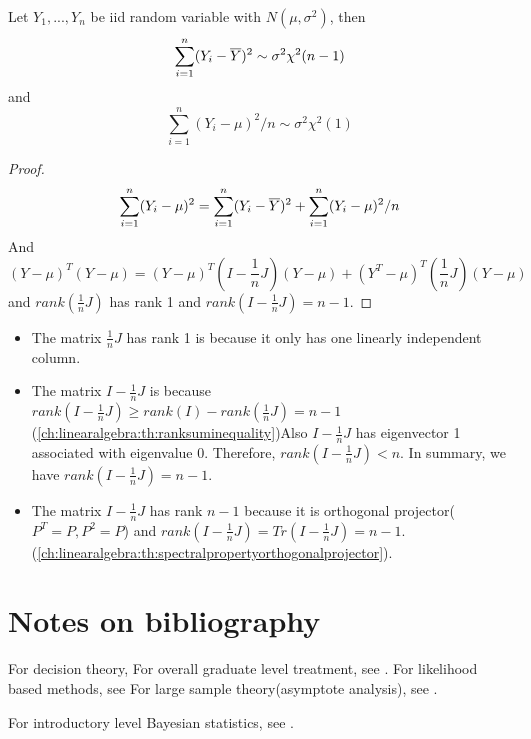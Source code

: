 \begin{refsection}
\begin{corollary}\label{ch:theory-of-statistics:th:samplevariancedistribution}
	Let $Y_1,...,Y_n$ be iid random variable with $N(\mu,\sigma^2)$, then
	$$\sum_{i=1}^n (Y_i - \overline{Y})^2 \sim \sigma^2 \chi^2(n-1)$$
	and
	$$\sum_{i=1}^n (Y_i - \mu)^2/n \sim \sigma^2 \chi^2(1)$$
\end{corollary}
\begin{proof}
	$$\sum_{i=1}^n (Y_i- \mu)^2 = \sum_{i=1}^n (Y_i - \overline{Y})^2 + \sum_{i=1}^n (Y_i - \mu)^2/n$$
	And
	$$(Y-\mu)^T(Y-\mu) = (Y-\mu)^T(I - \frac{1}{n}J)(Y-\mu) + (Y^T-\mu)^T(\frac{1}{n}J)(Y-\mu)$$
	and $rank(\frac{1}{n}J)$ has rank 1 and $rank(I - \frac{1}{n}J) = n-1$.
\end{proof}


\begin{remark}\hfill
	\begin{itemize}
		\item The matrix $\frac{1}{n}J$ has rank 1 is because it only has one linearly independent column.
		\item The matrix $I - \frac{1}{n}J$ is because
		$rank(I - \frac{1}{n}J) \geq rank(I) - rank(\frac{1}{n}J) = n-1$(\autoref{ch:linearalgebra:th:ranksuminequality})Also  $I - \frac{1}{n}J$ has eigenvector 1 associated with eigenvalue 0. Therefore, $rank(I - \frac{1}{n}J) < n$. In summary, we have $rank(I - \frac{1}{n}J)=n-1$.
		\item The matrix $I -  \frac{1}{n}J$ has rank $n-1$ because it is orthogonal projector($P^T=P,P^2=P$) and $rank(I -  \frac{1}{n}J)=Tr(I -  \frac{1}{n}J) = n-1$.(\autoref{ch:linearalgebra:th:spectralpropertyorthogonalprojector}).
	\end{itemize}
\end{remark}



\section{Notes on bibliography}
For decision theory, \cite{young2005essentials}\cite{moon2000mathematical}
For overall graduate level treatment, see \cite{casella2002statistical}\cite{hoggintroduction}.
For likelihood based methods, see \cite{pawitan2001all}
For large sample theory(asymptote analysis), see \cite{lehmann1999elements}.

For introductory level Bayesian statistics, see \cite{hoff2009first}.


\end{refsection}
